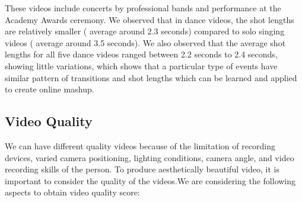 \documentclass{sig-alternate}
\begin{document}
These videos include concerts by professional bands and performance at the Academy Awards ceremony. We observed that in dance videos, the shot lengths are relatively smaller ( average around 2.3 seconds) compared to solo singing videos ( average around 3.5 seconds).  We also observed that the average shot lengths for all ﬁve dance videos ranged between 2.2 seconds to 2.4 seconds, showing little variations, which shows that a particular type of events have similar pattern of transitions and shot lengths which can be learned and applied to create online mashup.




\subsection{Video Quality}
We can have different quality videos because of the limitation of recording devices, varied camera positioning, lighting conditions, camera angle, and video recording skills of the person. To produce aesthetically beautiful video, it is important to consider the quality of the videos.We are considering the following aspects to obtain video quality score:
\end{document}
